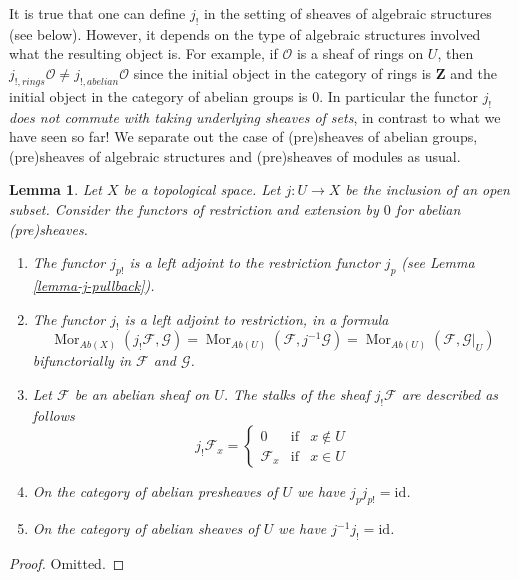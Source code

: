 \documentclass{stacks-project}
\theoremstyle{plain}
\newtheorem{lemma}[subsection]{Lemma}
\theoremstyle{definition}
\theoremstyle{remark}
\numberwithin{equation}{subsection}
\def\Mor{\mathop{\mathrm{Mor}}\nolimits}
\begin{document}
\noindent
It is true that one can define $j_!$ in the setting of sheaves
of algebraic structures (see below). However, it depends on the
type of algebraic structures involved what the resulting
object is. For example, if $\mathcal{O}$ is a sheaf of rings
on $U$, then $j_{!, rings}\mathcal{O} \not = j_{!, abelian}\mathcal{O}$
since the initial object in the category of rings
is $\mathbf{Z}$ and the initial object in the category
of abelian groups is $0$. In particular the functor $j_!$
{\it does not commute with taking underlying sheaves of sets},
in contrast to what we have seen so far! We separate out the case
of (pre)sheaves of abelian groups, (pre)sheaves of algebraic structures
and (pre)sheaves of modules as usual.

\begin{lemma}
\label{lemma-j-shriek-abelian}
Let $X$ be a topological space.
Let $j : U \to X$ be the inclusion of an open subset.
Consider the functors of restriction and extension
by $0$ for abelian (pre)sheaves.
\begin{enumerate}
\item The functor $j_{p!}$ is a left adjoint to the
restriction functor $j_p$ (see Lemma \ref{lemma-j-pullback}).
\item The functor $j_!$ is a left adjoint to restriction,
in a formula
$$
\Mor_{\textit{Ab}(X)}(j_!\mathcal{F}, \mathcal{G})
=
\Mor_{\textit{Ab}(U)}(\mathcal{F}, j^{-1}\mathcal{G})
=
\Mor_{\textit{Ab}(U)}(\mathcal{F}, \mathcal{G}|_U)
$$
bifunctorially in $\mathcal{F}$ and $\mathcal{G}$.
\item Let $\mathcal{F}$ be an abelian sheaf on $U$.
The stalks of the sheaf $j_!\mathcal{F}$ are described
as follows
$$
j_{!}\mathcal{F}_x =
\left\{
\begin{matrix}
0 & \text{if} & x \not \in U \\
\mathcal{F}_x & \text{if} & x \in U
\end{matrix}
\right.
$$
\item On the category of abelian presheaves of $U$
we have $j_pj_{p!} = \text{id}$.
\item On the category of abelian sheaves of $U$
we have $j^{-1}j_! = \text{id}$.
\end{enumerate}
\end{lemma}

\begin{proof}
Omitted.
\end{proof}
\end{document}
